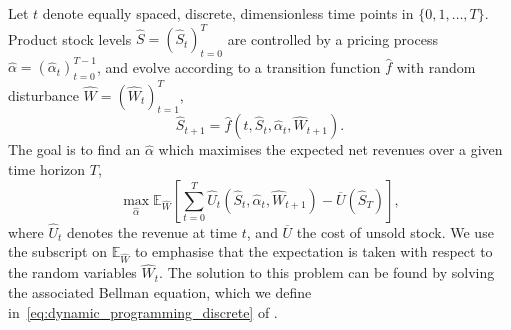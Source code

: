 \documentclass[main.tex]{subfiles}
\begin{document}
Let $t$ denote equally spaced, discrete, dimensionless time points in $\{0,1,\dots,T\}$.
Product stock levels $\hat{S}={(\hat{S}_t)}_{t=0}^T$ are controlled by a pricing process
$\hat{\alpha}={(\hat{\alpha}_t)}_{t=0}^{T-1}$, and evolve according to a transition function $\hat{f}$ with random disturbance
$\hat{W}={(\hat{W}_t)}_{t=1}^T$,
\begin{equation}
  \hat{S}_{t+1}=\hat{f}(t,\hat{S}_t,\hat{\alpha}_t,\hat{W}_{t+1}).
\end{equation}
The goal is to find an $\hat{\alpha}$ which maximises the expected net revenues over a
given time horizon $T$,
\begin{equation}
  \max_{\hat{\alpha}}\mathbb E_{\hat{W}}\left[ \sum_{t=0}^T\hat{U}_t(\hat{S}_t,\hat{\alpha}_t,\hat{W}_{t+1})
    - \overline{U}(\hat{S}_T)\right],
\end{equation}
where $\hat{U}_t$ denotes the revenue at time $t$, and $\overline{U}$ the
cost of unsold stock.
We use the subscript on $\mathbb{E}_{\hat{W}}$ to emphasise that the
expectation is taken with respect to the random variables $\hat{W}_t$.
The solution to this problem can be found by solving the associated
Bellman equation, which we define
in~\eqref{eq:dynamic_programming_discrete} of
.
\end{document}

